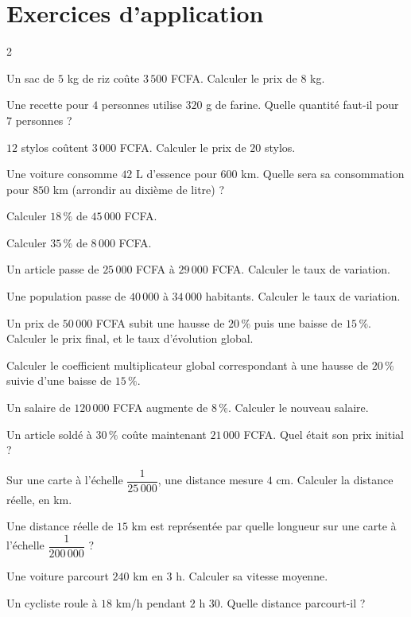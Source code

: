 \section{Exercices d'application}
\begin{multicols}{2}

\exo{} Un sac de $5$ kg de riz coûte $3\,500$ FCFA. Calculer le prix de $8$ kg.

\exo{} Une recette pour $4$ personnes utilise $320$ g de farine. Quelle quantité
faut-il pour $7$ personnes ?

\exo{} $12$ stylos coûtent $3\,000$ FCFA. Calculer le prix de $20$ stylos.

\exo{} Une voiture consomme $42$ L d'essence pour $600$ km. Quelle sera sa
consommation pour $850$ km (arrondir au dixième de litre) ?

\exo{} Calculer $18\,\%$ de $45\,000$ FCFA.

\exo{} Calculer $35\,\%$ de $8\,000$ FCFA.

\exo{} Un article passe de $25\,000$ FCFA à $29\,000$ FCFA. Calculer le taux de
variation.

\exo{} Une population passe de $40\,000$ à $34\,000$ habitants. Calculer le taux de
variation.

\exo{} Un prix de $50\,000$ FCFA subit une hausse de $20\,\%$ puis une baisse de
$15\,\%$. Calculer le prix final, et le taux d'évolution global.

\exo{} Calculer le coefficient multiplicateur global correspondant à une hausse de
$20\,\%$ suivie d'une baisse de $15\,\%$.

\exo{} Un salaire de $120\,000$ FCFA augmente de $8\,\%$. Calculer le nouveau
salaire.

\exo{} Un article soldé à $30\,\%$ coûte maintenant $21\,000$ FCFA. Quel était son
prix initial ?

\exo{} Sur une carte à l'échelle $\dfrac1{25\,000}$, une distance mesure $4$ cm.
Calculer la distance réelle, en km.

\exo{} Une distance réelle de $15$ km est représentée par quelle longueur sur une
carte à l'échelle $\dfrac1{200\,000}$ ?

\exo{} Une voiture parcourt $240$ km en $3$ h. Calculer sa vitesse moyenne.

\exo{} Un cycliste roule à $18$ km/h pendant $2$ h $30$. Quelle distance
parcourt-il ?

\end{multicols}

